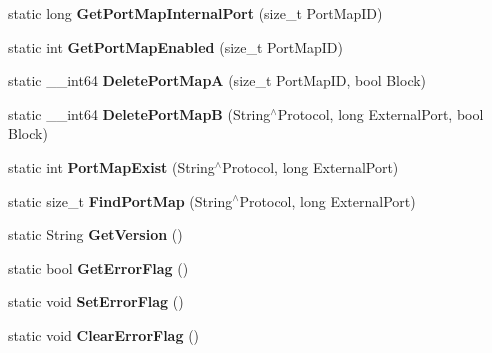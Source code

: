 \begin{DoxyCompactItemize}
\item 
\hypertarget{structmn_c_l_r_af7972e5311c78152936dc4d66962cfe2}{
static long {\bfseries GetPortMapInternalPort} (size\_\-t PortMapID)}
\label{structmn_c_l_r_af7972e5311c78152936dc4d66962cfe2}

\item 
\hypertarget{structmn_c_l_r_a00e438fb4329f44e855826dabbe2bddf}{
static int {\bfseries GetPortMapEnabled} (size\_\-t PortMapID)}
\label{structmn_c_l_r_a00e438fb4329f44e855826dabbe2bddf}

\item 
\hypertarget{structmn_c_l_r_a070e1b361aec9fcaab8ebbf9a5f83f70}{
static \_\-\_\-int64 {\bfseries DeletePortMapA} (size\_\-t PortMapID, bool Block)}
\label{structmn_c_l_r_a070e1b361aec9fcaab8ebbf9a5f83f70}

\item 
\hypertarget{structmn_c_l_r_a56b8d0a9f000616cfb45a18805d8fa5e}{
static \_\-\_\-int64 {\bfseries DeletePortMapB} (String$^\wedge$Protocol, long ExternalPort, bool Block)}
\label{structmn_c_l_r_a56b8d0a9f000616cfb45a18805d8fa5e}

\item 
\hypertarget{structmn_c_l_r_ac723c27792e39faeafb7ece391be6230}{
static int {\bfseries PortMapExist} (String$^\wedge$Protocol, long ExternalPort)}
\label{structmn_c_l_r_ac723c27792e39faeafb7ece391be6230}

\item 
\hypertarget{structmn_c_l_r_a68f71658c62e86169aeaac60c64ff36e}{
static size\_\-t {\bfseries FindPortMap} (String$^\wedge$Protocol, long ExternalPort)}
\label{structmn_c_l_r_a68f71658c62e86169aeaac60c64ff36e}

\item 
\hypertarget{structmn_c_l_r_a293fc0853173665846284756e8891e68}{
static String {\bfseries GetVersion} ()}
\label{structmn_c_l_r_a293fc0853173665846284756e8891e68}

\item 
\hypertarget{structmn_c_l_r_a06204ca0a8787c2ed455d4f1c7af8a7f}{
static bool {\bfseries GetErrorFlag} ()}
\label{structmn_c_l_r_a06204ca0a8787c2ed455d4f1c7af8a7f}

\item 
\hypertarget{structmn_c_l_r_ad1da43fe34ef4392680a9ab98ee288f6}{
static void {\bfseries SetErrorFlag} ()}
\label{structmn_c_l_r_ad1da43fe34ef4392680a9ab98ee288f6}

\item 
\hypertarget{structmn_c_l_r_a8a3de9b8dc075aa9b2800ed00bb2d0e6}{
static void {\bfseries ClearErrorFlag} ()}
\label{structmn_c_l_r_a8a3de9b8dc075aa9b2800ed00bb2d0e6}


\end{DoxyCompactItemize}

